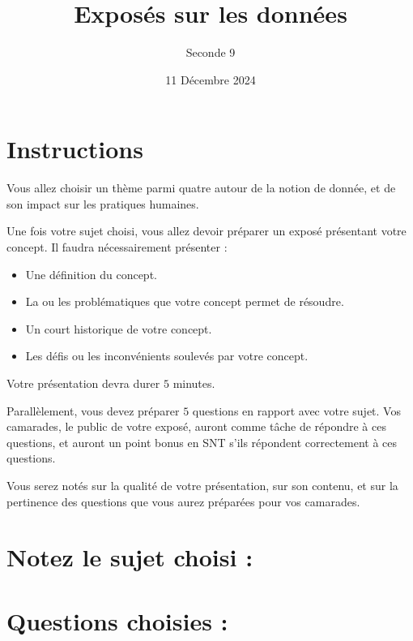 \documentclass{article}
\title{Exposés sur les données}
\date{11 Décembre 2024}
\author{Seconde 9}
\begin{document}
\maketitle

\section*{Instructions}
Vous allez choisir un thème parmi quatre autour de la notion de donnée, et de son impact sur les pratiques humaines.

Une fois votre sujet choisi, vous allez devoir préparer un exposé présentant votre concept. Il faudra nécessairement présenter :
\begin{itemize}
\item Une définition du concept.
\item La ou les problématiques que votre concept permet de résoudre. 
\item Un court historique de votre concept.
\item Les défis ou les inconvénients soulevés par votre concept.
\end{itemize}

Votre présentation devra durer $5$ minutes.

Parallèlement, vous devez préparer $5$ questions en rapport avec votre sujet. Vos camarades, le public de votre exposé, auront comme tâche de répondre à ces questions, et auront un point bonus en SNT s'ils répondent correctement à ces questions.

Vous serez notés sur la qualité de votre présentation, sur son contenu, et sur la pertinence des questions que vous aurez préparées pour vos camarades.
\section*{Notez le sujet choisi : }
\section*{Questions choisies :}
\section{}
\section{}
\section{}
\section{}
\section{}
\end{document}
